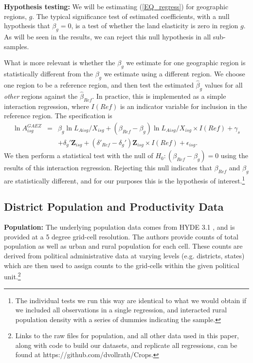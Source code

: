\documentclass[11pt]{article}
\begin{document}
\vspace{.5cm}\noindent\textbf{Hypothesis testing:} We will be estimating (\ref{EQ_regress}) for geographic regions, $g$. The typical significance test of estimated coefficients, with a null hypothesis that $\beta_g=0$, is a test of whether the land elasticity is zero in region $g$. As will be seen in the results, we can reject this null hypothesis in all sub-samples.

What is more relevant is whether the $\beta_g$ we estimate for one geographic region is statistically different from the $\beta_g$ we estimate using a different region. We choose one region to be a reference region, and then test the estimated $\hat{\beta}_g$ values for all \textit{other} regions against the $\hat{\beta}_{Ref}$. In practice, this is implemented as a simple interaction regression, where $I(Ref)$ is an indicator variable for inclusion in the reference region. The specification is
\begin{eqnarray}
    \ln A^{GAEZ}_{isg} &=& \beta_g \ln L_{Aisg}/X_{isg} + (\beta_{Ref} - \beta_g) \ln L_{Aisg}/X_{isg} \times I(Ref) + \gamma_{s} \\ \nonumber
     && + \delta_g' \mathbf{Z}_{isg} + (\delta'_{Ref} - \delta_g') \mathbf{Z}_{isg} \times I(Ref) + \epsilon_{isg}. \label{EQ_interaction}
\end{eqnarray}
We then perform a statistical test with the null of $H_0: (\beta_{Ref} - \beta_g) = 0$ using the results of this interaction regression. Rejecting this null indicates that $\beta_{Ref}$ and $\beta_g$ are statistically different, and for our purposes this is the hypothesis of interest.\footnote{The individual tests we run this way are identical to what we would obtain if we included all observations in a single regression, and interacted rural population density with a series of dummies indicating the sample.}

\subsection{District Population and Productivity Data}

\noindent\textbf{Population:} The underlying population data comes from HYDE 3.1 \citep{hyde31}, and is provided at a 5 degree grid-cell resolution. The authors provide counts of total population as well as urban and rural population for each cell. These counts are derived from political administrative data at varying levels (e.g. districts, states) which are then used to assign counts to the grid-cells within the given political unit.\footnote{Links to the raw files for population, and all other data used in this paper, along with code to build our datasets, and replicate all regressions, can be found at https://github.com/dvollrath/Crops.}
\end{document}
